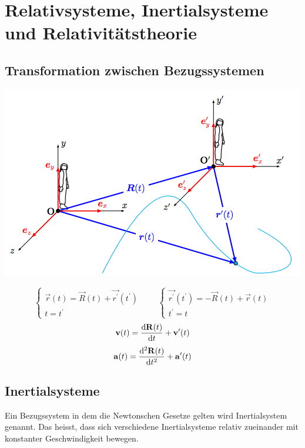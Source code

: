\section{Relativsysteme, Inertialsysteme und Relativitätstheorie}
\subsection{Transformation zwischen Bezugssystemen}
\begin{center}
\includegraphics[scale=0.5]{./images/Bezugssysteme.png}
\end{center}
\begin{equation}
\begin{cases}
\vec{r} (t) = \vec{R} (t) + \vec{r^\prime} (t^\prime) \\
t = t^\prime
\end{cases}
\qquad
\begin{cases}
\vec{r^\prime} (t^\prime) = - \vec{R} (t) + \vec{r} (t) \\
t^\prime = t
\end{cases}
\end{equation}
\begin{equation}
\mathbf{v}(t) = \frac{\mathrm d \mathbf{R}(t)}{\mathrm d t} + \mathbf{v^\prime} (t)
\end{equation}
\begin{equation}
\mathbf{a}(t) = \frac{\mathrm d^2 \mathbf{R}(t)}{\mathrm d t^2} + \mathbf{a^\prime} (t)
\end{equation}
\subsection{Inertialsysteme}
Ein Bezugssystem in dem die Newtonschen Gesetze gelten wird Inertialsystem genannt. Das heisst, dass sich verschiedene Inertialsysteme relativ zueinander mit konstanter Geschwindigkeit bewegen.
